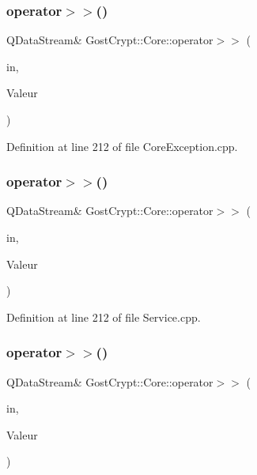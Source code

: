 \subsubsection{\texorpdfstring{operator$>$$>$()}{operator>>()}\hspace{0.1cm}{\footnotesize\ttfamily [38/56]}}
{\footnotesize\ttfamily Q\+Data\+Stream\& Gost\+Crypt\+::\+Core\+::operator$>$$>$ (\begin{DoxyParamCaption}\item[{Q\+Data\+Stream \&}]{in,  }\item[{\hyperlink{class_gost_crypt_1_1_core_1_1_format_process_failed}{Gost\+Crypt\+::\+Core\+::\+Format\+Process\+Failed} \&}]{Valeur }\end{DoxyParamCaption})}



Definition at line 212 of file Core\+Exception.\+cpp.

\mbox{\label{namespace_gost_crypt_1_1_core_a1a57c7227e93a423e54a737e816aaaab}} 
\subsubsection{\texorpdfstring{operator$>$$>$()}{operator>>()}\hspace{0.1cm}{\footnotesize\ttfamily [39/56]}}
{\footnotesize\ttfamily Q\+Data\+Stream\& Gost\+Crypt\+::\+Core\+::operator$>$$>$ (\begin{DoxyParamCaption}\item[{Q\+Data\+Stream \&}]{in,  }\item[{\hyperlink{class_gost_crypt_1_1_core_1_1_unknow_request}{Gost\+Crypt\+::\+Core\+::\+Unknow\+Request} \&}]{Valeur }\end{DoxyParamCaption})}



Definition at line 212 of file Service.\+cpp.

\mbox{\label{namespace_gost_crypt_1_1_core_a1812ab8e3add353b2c0f249d0c39535d}} 
\subsubsection{\texorpdfstring{operator$>$$>$()}{operator>>()}\hspace{0.1cm}{\footnotesize\ttfamily [40/56]}}
{\footnotesize\ttfamily Q\+Data\+Stream\& Gost\+Crypt\+::\+Core\+::operator$>$$>$ (\begin{DoxyParamCaption}\item[{Q\+Data\+Stream \&}]{in,  }\item[{\hyperlink{struct_gost_crypt_1_1_core_1_1_get_mounted_volumes_request}{Get\+Mounted\+Volumes\+Request} \&}]{Valeur }\end{DoxyParamCaption})}



